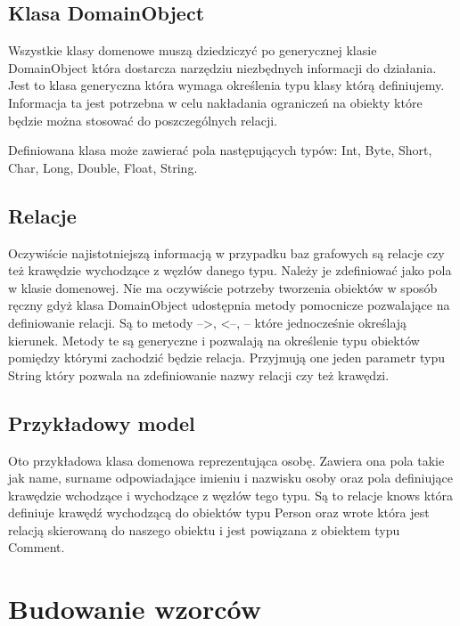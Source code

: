 \documentclass[brudnopis]{xmgr}
\begin{document}
\subsection{Klasa DomainObject}

Wszystkie klasy domenowe muszą dziedziczyć po generycznej klasie DomainObject która dostarcza narzędziu niezbędnych informacji do działania. Jest to klasa generyczna która wymaga określenia typu klasy którą definiujemy. Informacja ta jest potrzebna w celu nakładania ograniczeń na obiekty które będzie można stosować do poszczególnych relacji.

Definiowana klasa może zawierać pola następujących typów: Int, Byte, Short, Char, Long, Double, Float, String.

\subsection{Relacje}

Oczywiście najistotniejszą informacją w przypadku baz grafowych są relacje czy też krawędzie wychodzące z węzłów danego typu. Należy je zdefiniować jako pola w klasie domenowej. Nie ma oczywiście potrzeby tworzenia obiektów w sposób ręczny gdyż klasa DomainObject udostępnia metody pomocnicze pozwalające na definiowanie relacji. Są to metody  -->, <--, -- które jednocześnie określają kierunek. Metody te są generyczne i pozwalają na określenie typu obiektów pomiędzy którymi zachodzić będzie relacja. Przyjmują one jeden parametr typu String który pozwala na zdefiniowanie nazwy relacji czy też krawędzi.

\subsection{Przykładowy model}

Oto przykładowa klasa domenowa reprezentująca osobę. Zawiera ona pola takie jak name, surname odpowiadające imieniu i nazwisku osoby oraz pola definiujące krawędzie wchodzące i wychodzące z węzłów tego typu. Są to relacje knows która definiuje krawędź wychodzącą do obiektów typu Person oraz wrote która jest relacją skierowaną do naszego obiektu i jest powiązana z obiektem typu Comment.



\section{Budowanie wzorców}
\end{document}
